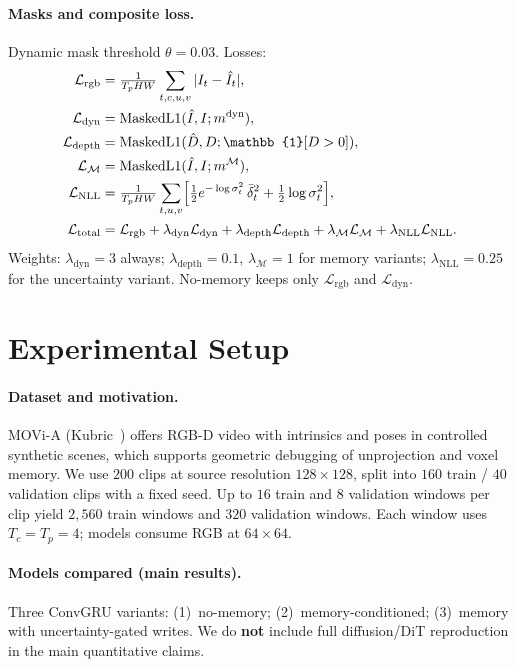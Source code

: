\documentclass[11pt]{article}
\begin{document}
\paragraph{Masks and composite loss.}
Dynamic mask threshold $\theta=0.03$. Losses:
\begin{align}
\mathcal{L}_{\text{rgb}} &= \tfrac{1}{T_p HW}\sum_{t,c,u,v}
|I_t - \hat I_t|, \\
\mathcal{L}_{\text{dyn}} &= \mathrm{MaskedL1}(\hat I, I; m^{\text{dyn}}), \\
\mathcal{L}_{\text{depth}} &= \mathrm{MaskedL1}(\hat D, D; \mathbb{1}[D>0]), \\
\mathcal{L}_{\mathcal{M}} &= \mathrm{MaskedL1}(\hat I, I; m^{\mathcal{M}}), \\
\mathcal{L}_{\text{NLL}} &=
\tfrac{1}{T_p HW}\sum_{t,u,v}
\Bigl[\tfrac{1}{2}e^{-\log\sigma_t^2}\,\bar{\delta}_t^2
+ \tfrac{1}{2}\log\sigma_t^2\Bigr], \\
\mathcal{L}_{\text{total}} &=
\mathcal{L}_{\text{rgb}}
+ \lambda_{\text{dyn}}\mathcal{L}_{\text{dyn}}
+ \lambda_{\text{depth}}\mathcal{L}_{\text{depth}}
+ \lambda_{\mathcal{M}}\mathcal{L}_{\mathcal{M}}
+ \lambda_{\text{NLL}}\mathcal{L}_{\text{NLL}}.
\end{align}
Weights: $\lambda_{\text{dyn}}=3$ always; $\lambda_{\text{depth}}=0.1$, $\lambda_{\mathcal{M}}=1$ for memory
variants; $\lambda_{\text{NLL}}=0.25$ for the uncertainty variant. No-memory keeps only
$\mathcal{L}_{\text{rgb}}$ and $\mathcal{L}_{\text{dyn}}$.

\section{Experimental Setup}
\label{sec:setup}

\paragraph{Dataset and motivation.}
MOVi-A (Kubric~\cite{kubric}) offers RGB-D video with intrinsics and poses in controlled synthetic scenes,
which supports geometric debugging of unprojection and voxel memory. We use $200$ clips at source resolution
$128\times128$, split into $160$ train / $40$ validation clips with a fixed seed. Up to $16$ train and $8$
validation windows per clip yield $2{,}560$ train windows and $320$ validation windows. Each window uses
$T_c=T_p=4$; models consume RGB at $64\times64$.

\paragraph{Models compared (main results).}
Three ConvGRU variants: (1)~no-memory; (2)~memory-conditioned; (3)~memory with uncertainty-gated writes.
We do \textbf{not} include full diffusion/DiT reproduction in the main quantitative claims.
\end{document}
